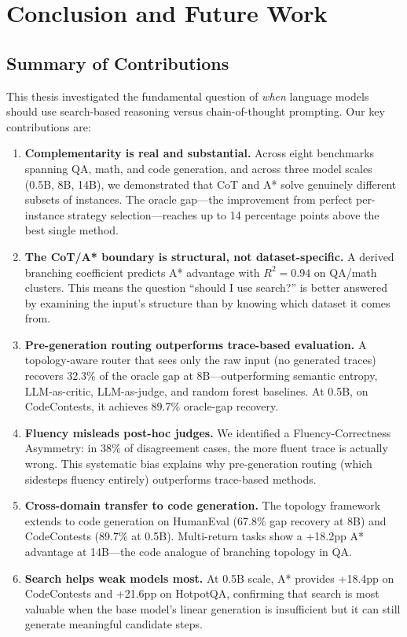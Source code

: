 \chapter{Conclusion and Future Work}

\section{Summary of Contributions}

This thesis investigated the fundamental question of \emph{when} language models should use search-based reasoning versus chain-of-thought prompting. Our key contributions are:

\begin{enumerate}
\item \textbf{Complementarity is real and substantial.} Across eight benchmarks spanning QA, math, and code generation, and across three model scales (0.5B, 8B, 14B), we demonstrated that CoT and A* solve genuinely different subsets of instances. The oracle gap---the improvement from perfect per-instance strategy selection---reaches up to 14 percentage points above the best single method.

\item \textbf{The CoT/A* boundary is structural, not dataset-specific.} A derived branching coefficient predicts A* advantage with $R^2 = 0.94$ on QA/math clusters. This means the question ``should I use search?'' is better answered by examining the input's structure than by knowing which dataset it comes from.

\item \textbf{Pre-generation routing outperforms trace-based evaluation.} A topology-aware router that sees only the raw input (no generated traces) recovers 32.3\% of the oracle gap at 8B---outperforming semantic entropy, LLM-as-critic, LLM-as-judge, and random forest baselines. At 0.5B, on CodeContests, it achieves 89.7\% oracle-gap recovery.

\item \textbf{Fluency misleads post-hoc judges.} We identified a Fluency-Correctness Asymmetry: in 38\% of disagreement cases, the more fluent trace is actually wrong. This systematic bias explains why pre-generation routing (which sidesteps fluency entirely) outperforms trace-based methods.

\item \textbf{Cross-domain transfer to code generation.} The topology framework extends to code generation on HumanEval (67.8\% gap recovery at 8B) and CodeContests (89.7\% at 0.5B). Multi-return tasks show a +18.2pp A* advantage at 14B---the code analogue of branching topology in QA.

\item \textbf{Search helps weak models most.} At 0.5B scale, A* provides +18.4pp on CodeContests and +21.6pp on HotpotQA, confirming that search is most valuable when the base model's linear generation is insufficient but it can still generate meaningful candidate steps.
\end{enumerate}

